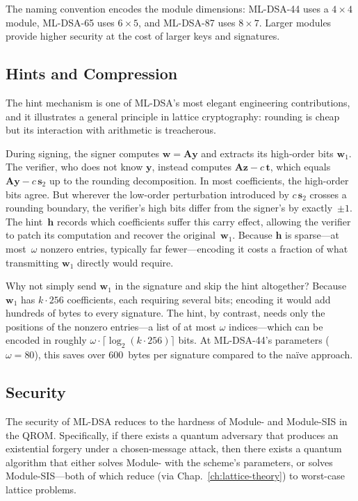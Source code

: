 The naming convention encodes the module dimensions: ML-DSA-44 uses a $4 \times 4$ module, ML-DSA-65 uses $6 \times 5$, and ML-DSA-87 uses $8 \times 7$.  Larger modules provide higher security at the cost of larger keys and signatures.

\subsection{Hints and Compression}
\label{subsec:hints-compression}

The hint mechanism is one of ML-DSA's most elegant engineering contributions, and it illustrates a general principle in lattice cryptography: rounding is cheap but its interaction with arithmetic is treacherous.

During signing, the signer computes $\mathbf{w} = \mathbf{A}\mathbf{y}$ and extracts its high-order bits $\mathbf{w}_1$.  The verifier, who does not know $\mathbf{y}$, instead computes $\mathbf{A}\mathbf{z} - c\,\mathbf{t}$, which equals $\mathbf{A}\mathbf{y} - c\,\mathbf{s}_2$ up to the rounding decomposition.  In most coefficients, the high-order bits agree.  But wherever the low-order perturbation introduced by $c\,\mathbf{s}_2$ crosses a rounding boundary, the verifier's high bits differ from the signer's by exactly~$\pm 1$.  The hint~$\mathbf{h}$ records which coefficients suffer this carry effect, allowing the verifier to patch its computation and recover the original~$\mathbf{w}_1$.  Because $\mathbf{h}$ is sparse---at most~$\omega$ nonzero entries, typically far fewer---encoding it costs a fraction of what transmitting $\mathbf{w}_1$ directly would require.

Why not simply send $\mathbf{w}_1$ in the signature and skip the hint altogether?  Because $\mathbf{w}_1$ has $k \cdot 256$ coefficients, each requiring several bits; encoding it would add hundreds of bytes to every signature.  The hint, by contrast, needs only the positions of the nonzero entries---a list of at most $\omega$ indices---which can be encoded in roughly $\omega \cdot \lceil\log_2(k \cdot 256)\rceil$ bits.  At ML-DSA-44's parameters ($\omega = 80$), this saves over 600~bytes per signature compared to the na\"ive approach.

\subsection{Security}
\label{subsec:ml-dsa-security}

The security of ML-DSA reduces to the hardness of Module-\lwe{} and Module-SIS in the QROM.  Specifically, if there exists a quantum adversary that produces an existential forgery under a chosen-message attack, then there exists a quantum algorithm that either solves Module-\lwe{} with the scheme's parameters, or solves Module-SIS---both of which reduce (via Chap.~\ref{ch:lattice-theory}) to worst-case lattice problems.

